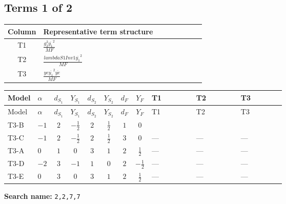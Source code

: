 \documentclass[8pt]{article}
\begin{document}
\begin{landscape}
\subsection*{Terms 1 of 2}
\begin{center}
\begin{tabular}{@{}c >{\raggedright\arraybackslash}p{0.82\linewidth}@{}}
\toprule
Column & Representative term structure \\
\midrule
T1 & \(\displaystyle \frac{g_{2}^{2} \overline{y_{1}}^{2}}{MF}\) \\
\midrule
T2 & \(\displaystyle \frac{lambdaS1Inv1 \overline{y_{1}}^{2}}{MF}\) \\
\midrule
T3 & \(\displaystyle \frac{ye \overline{y_{1}}^{2} \overline{ye}}{MF}\) \\
\midrule
\bottomrule
\end{tabular}
\end{center}
\smallskip
\tiny
\begin{longtable}{@{}llcccccc >{\raggedright\arraybackslash}p{0.21\linewidth} >{\raggedright\arraybackslash}p{0.21\linewidth} >{\raggedright\arraybackslash}p{0.21\linewidth}@{}}
\toprule
Model & $\alpha$ & $d_{S_1}$ & $Y_{S_1}$ & $d_{S_2}$ & $Y_{S_2}$ & $d_F$ & $Y_F$ & T1 & T2 & T3 \\
\midrule
\endfirsthead
\toprule
Model & $\alpha$ & $d_{S_1}$ & $Y_{S_1}$ & $d_{S_2}$ & $Y_{S_2}$ & $d_F$ & $Y_F$ & T1 & T2 & T3 \\
\midrule
\endhead
T3-B & $-1$ & $2$ & $-\frac{1}{2}$ & $2$ & $\frac{1}{2}$ & $1$ & $0$ & \scriptsize\adjustbox{max width=\linewidth}{$\begin{gathered} - \frac{3 g_{2}^{2} \overline{y_{1}}^{2}}{4 MF}\end{gathered}$} & \scriptsize\adjustbox{max width=\linewidth}{$\begin{gathered} - \frac{lambdaS1Inv1 \overline{y_{1}}^{2}}{2 MF}\end{gathered}$} & \scriptsize\adjustbox{max width=\linewidth}{$\begin{gathered} \frac{ye \overline{y_{1}}^{2} \overline{ye}}{4 MF}\end{gathered}$} \\
\midrule
T3-C & $-1$ & $2$ & $-\frac{1}{2}$ & $2$ & $\frac{1}{2}$ & $3$ & $0$ & --- & --- & --- \\
\midrule
T3-A & $0$ & $1$ & $0$ & $3$ & $1$ & $2$ & $\frac{1}{2}$ & --- & --- & --- \\
\midrule
T3-D & $-2$ & $3$ & $-1$ & $1$ & $0$ & $2$ & $-\frac{1}{2}$ & --- & --- & --- \\
\midrule
T3-E & $0$ & $3$ & $0$ & $3$ & $1$ & $2$ & $\frac{1}{2}$ & --- & --- & --- \\
\midrule
\bottomrule
\end{longtable}
\clearpage
\noindent\textbf{Search name: }\texttt{2,2,7,7}\par\smallskip

\end{landscape}
\end{document}
